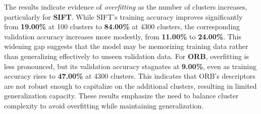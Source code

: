 \documentclass[12pt]{article}
\begin{document}
\textbf{} The results indicate evidence of \textit{overfitting} as the number of clusters increases, particularly for \textbf{SIFT}. While SIFT’s training accuracy improves significantly from \textbf{19.00\%} at 100 clusters to \textbf{84.00\%} at 4300 clusters, the corresponding validation accuracy increases more modestly, from \textbf{11.00\%} to \textbf{24.00\%}. This widening gap suggests that the model may be memorizing training data rather than generalizing effectively to unseen validation data. For \textbf{ORB}, overfitting is less pronounced, but its validation accuracy stagnates at \textbf{9.00\%}, even as training accuracy rises to \textbf{47.00\%} at 4300 clusters. This indicates that ORB's descriptors are not robust enough to capitalize on the additional clusters, resulting in limited generalization capacity. These results emphasize the need to balance cluster complexity to avoid overfitting while maintaining generalization.
\end{document}

